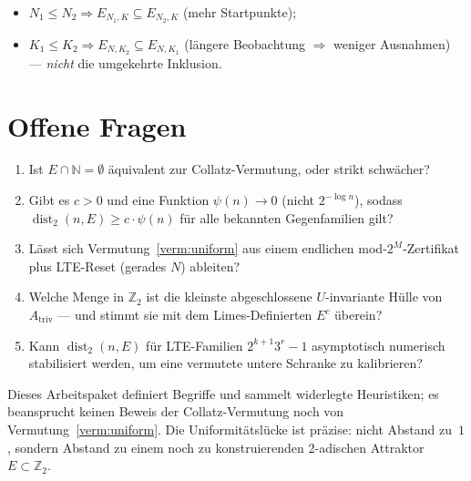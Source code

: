 \documentclass[12pt,a4paper]{article}
\newcommand{\N}{\mathbb{N}}
\newcommand{\Ztwo}{\mathbb{Z}_2}
\newcommand{\disttwo}{\operatorname{dist}_2}
\begin{document}
\begin{itemize}[nosep]
  \item $N_1\leq N_2\Rightarrow E_{N_1,K}\subseteq E_{N_2,K}$ (mehr Startpunkte);
  \item $K_1\leq K_2\Rightarrow E_{N,K_2}\subseteq E_{N,K_1}$ (l\"angere Beobachtung
    $\Rightarrow$ weniger Ausnahmen) --- \emph{nicht} die umgekehrte Inklusion.
\end{itemize}

\section{Offene Fragen}
\label{sec:offen}

\begin{enumerate}[label=\textbf{F\arabic*.}]
  \item Ist $E\cap\N=\emptyset$ \"aquivalent zur Collatz-Vermutung, oder strikt schw\"acher?
  \item Gibt es $c>0$ und eine Funktion $\psi(n)\to 0$ (nicht $2^{-\log n}$), sodass
    $\disttwo(n,E)\geq c\cdot\psi(n)$ f\"ur alle bekannten Gegenfamilien gilt?
  \item L\"asst sich Vermutung~\ref{verm:uniform} aus einem endlichen
    mod-$2^M$-Zertifikat plus LTE-Reset (gerades $N$) ableiten?
  \item Welche Menge in $\Ztwo$ ist die kleinste abgeschlossene $U$-invariante
    H\"ulle von $A_{\mathrm{triv}}$ --- und stimmt sie mit dem Limes-Definierten $E^c$ \"uberein?
  \item Kann $\disttwo(n,E)$ f\"ur LTE-Familien $2^{k+1}3^r-1$ asymptotisch
    numerisch stabilisiert werden, um eine vermutete untere Schranke zu kalibrieren?
\end{enumerate}

\begin{tcolorbox}[offen,title={Ehrliche Einordnung}]
Dieses Arbeitspaket definiert Begriffe und sammelt widerlegte Heuristiken;
es beansprucht keinen Beweis der Collatz-Vermutung noch von
Vermutung~\ref{verm:uniform}.
Die Uniformit\"atsl\"ucke ist pr\"azise: nicht Abstand zu~$1$, sondern Abstand
zu einem noch zu konstruierenden 2-adischen Attraktor $E\subset\Ztwo$.
\end{tcolorbox}
\end{document}
